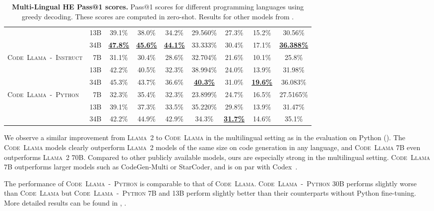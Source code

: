\documentclass[10pt]{article}
\newcommand{\model}{\textsc{Code~Llama}\xspace}
\newcommand{\instmodel}{\textsc{Code~Llama~-~Instruct}\xspace}
\newcommand{\pymodel}{\textsc{Code~Llama~-~Python}\xspace}
\newcommand{\llamavtwo}{\textsc{Llama~2}\xspace}
\newcommand*{\acc}[1]{\num[round-mode=places,round-precision=1]{#1}\%}
\begin{document}
\begin{table}[t!]
\begin{tabular}{lrcccccc|c}
  &13B                             & \acc{39.1} & \acc{38.0} & \acc{34.2} & \acc{29.560} & \acc{27.3} & \acc{15.2} & \acc{30.56} \\
  &34B                             & \bf{\underline{\acc{47.8}}} & \bf{\underline{\acc{45.6}}} & \bf{\underline{\acc{44.1}}} & \acc{33.333} & \acc{30.4} & \acc{17.1} & \bf{\underline{\acc{36.388}}} \\   
  \midrule  
  \multirow{ 3}{*}{\instmodel}&7B  &	\acc{31.1}	& \acc{30.4}	&\acc{28.6}& \acc{32.704}& \acc{21.6} & \acc{10.1} & \acc{25.8} \\
  &13B                             &	\acc{42.2}&\acc{40.5}&\acc{32.3}&\acc{38.994}&\acc{24.0}&	\acc{13.9}&\acc{31.98}   \\ 
  &34B                             &\acc{45.3}& \acc{43.7}	&\acc{36.6}		&\bf{\underline{\acc{40.3}}}&\acc{31.0}	&\bf{\underline{\acc{19.6}}}	&\acc{36.083} \\  
  \midrule
  \multirow{ 3}{*}{\pymodel}  &7B  & \acc{32.3} & \acc{35.4} & \acc{32.3} & \acc{23.899} & \acc{24.7} & \acc{16.5} & \acc{27.5165} \\
  &13B                             & \acc{39.1} & \acc{37.3} & \acc{33.5} & \acc{35.220} & \acc{29.8} & \acc{13.9} & \acc{31.47} \\
  &34B                             & \acc{42.2} & \acc{44.9} & \acc{42.9} & \acc{34.3} & \bf{\underline{\acc{31.7}}} & \acc{14.6} & \acc{35.1} \\
  \bottomrule
  \end{tabular}\caption{\textbf{Multi-Lingual HE Pass@1 scores.} Pass@1 scores for different programming languages using greedy decoding. These scores are computed in zero-shot.
  Results for other models from \citet{li2023starcoder}.\label{tab:mlhe_res}}
\end{table}

We observe a similar improvement from \llamavtwo to \model in the multilingual setting as in the evaluation on Python (). The \model models clearly outperform \llamavtwo models of the same size on code generation in any language, and \model 7B even outperforms \llamavtwo 70B. 
Compared to other publicly available models, ours are especially strong in the multilingual setting. 
\model 7B outperforms larger models such as CodeGen-Multi or StarCoder, and is on par with Codex~\citep[code-cushman-001,][]{chen2021evaluating}.

The performance of \pymodel is comparable to that of \model. \pymodel 30B performs slightly worse than \model but \pymodel 7B and 13B perform slightly better than their counterparts without Python fine-tuning. More detailed results can be found in , .
\end{document}

